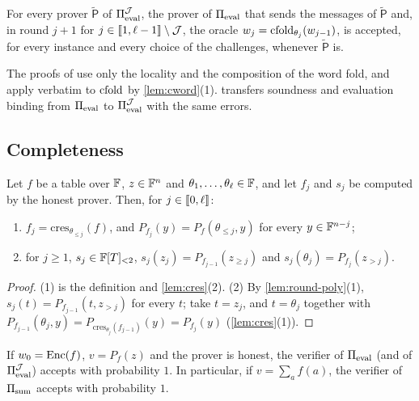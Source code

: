 \begin{lemma}\label{lem:skip}
For every prover $\tilde{\mathsf{P}}$ of $\Pi_{\mathrm{eval}}^{\mathcal{J}}$, the prover of $\Pi_{\mathrm{eval}}$ that sends the messages of $\tilde{\mathsf{P}}$ and, in round $j+1$ for $j \in \llbracket 1, \ell-1 \rrbracket \setminus \mathcal{J}$, the oracle $w_j = \mathrm{cfold}_{\theta_j}(w_{j-1})$, is accepted, for every instance and every choice of the challenges, whenever $\tilde{\mathsf{P}}$ is.
\end{lemma}

The proofs of  use only the locality and the composition of the word fold, and apply verbatim to $\mathrm{cfold}$ by \cref{lem:cword}(1).
 transfers soundness and evaluation binding from $\Pi_{\mathrm{eval}}$ to $\Pi_{\mathrm{eval}}^{\mathcal{J}}$ with the same errors.

\subsection{Completeness}\label{sec:scheme:complete}

\begin{lemma}\label{lem:honest}
Let $f$ be a table over $\mathbb{F}$, $z \in \mathbb{F}^n$ and $\theta_1,\dots,\theta_\ell \in \mathbb{F}$, and let $f_j$ and $s_j$ be computed by the honest prover. Then, for $j \in \llbracket 0, \ell \rrbracket$:
\begin{enumerate}
  \item $f_j = \mathrm{cres}_{\theta_{\le j}}(f)$, and $P_{f_j}(y) = P_f(\theta_{\le j}, y)$ for every $y \in \mathbb{F}^{n-j}$;
  \item for $j \ge 1$, $s_j \in \mathbb{F}[T]_{<2}$, $s_j(z_j) = P_{f_{j-1}}(z_{\ge j})$ and $s_j(\theta_j) = P_{f_j}(z_{>j})$.
\end{enumerate}
\end{lemma}

\begin{proof}
(1) is the definition and \cref{lem:cres}(2).
(2) By \cref{lem:round-poly}(1), $s_j(t) = P_{f_{j-1}}(t, z_{>j})$ for every $t$; take $t = z_j$, and $t = \theta_j$ together with $P_{f_{j-1}}(\theta_j, y) = P_{\mathrm{cres}_{\theta_j}(f_{j-1})}(y) = P_{f_j}(y)$ (\cref{lem:cres}(1)).
\end{proof}

\begin{theorem}[Completeness]\label{thm:complete}
If $w_0 = \mathrm{Enc}(f)$, $v = P_f(z)$ and the prover is honest, the verifier of $\Pi_{\mathrm{eval}}$ (and of $\Pi_{\mathrm{eval}}^{\mathcal{J}}$) accepts with probability $1$.
In particular, if $v = \sum_a f(a)$, the verifier of $\Pi_{\mathrm{sum}}$ accepts with probability $1$.
\end{theorem}


